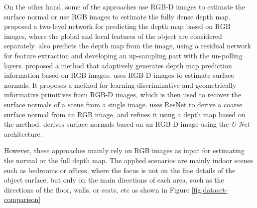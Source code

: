 On the other hand, some of the approaches use RGB-D images to estimate the surface normal or use RGB images to estimate the fully dense depth map.
\cite{Eigen} proposed a two-level network for predicting the depth map based on RGB images, where the global and local features of the object are considered separately. \cite{img2depth} also predicts the depth map from the image, using a residual network for feature extraction and developing an up-sampling part with the un-polling layers. 
\cite{binsformer} proposed a method that adaptively generates depth map prediction information based on RGB images. 
\cite{geometry_based_solution} uses RGB-D images to estimate surface normals. It proposes a method for learning discriminative and geometrically informative primitives from RGB-D images, which is then used to recover the surface normals of a scene from a single image. 
\cite{GeoNet} uses ResNet \cite{resnet} to derive a coarse surface normal from an RGB image, and refines it using a depth map based on the \cite{geometry_based_solution} method. 
\cite{hfm} derives surface normals based on an RGB-D image using the \textit{U-Net} architecture.

However, these approaches mainly rely on RGB images as input for estimating the normal or the full depth map. The applied scenarios are mainly indoor scenes such as bedrooms or offices, where the focus is not on the fine details of the object surface, but only on the main directions of each area, such as the directions of the floor, walls, or seats, etc as shown in Figure \ref{fig:dataset-comparison}

